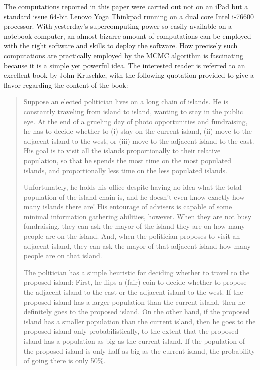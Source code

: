 \documentclass[alpha-refs,fleqn]{wiley-article_p2}
\begin{document}
The computations reported in this paper were carried out not on an iPad but a standard issue 64-bit Lenovo Yoga Thinkpad running on a dual core Intel i-76600 processor. With yesterday's supercomputing power so easily available on a notebook computer, an almost bizarre amount of computations can be employed with the right software and skills to deploy the software. How precisely such computations are practically employed by the MCMC algorithm is fascinating because it is a simple yet powerful idea. The interested reader is referred to an excellent book by John Kruschke, with the following quotation provided to give a flavor regarding the content of the book:

\begin{quote}

Suppose an elected politician lives on a long chain of islands. He is constantly traveling from island to island, wanting to stay in the public eye. At the end of a grueling day of photo opportunities and fundraising, he has to decide whether to (i) stay on the current island, (ii) move to the adjacent island to the west, or (iii) move to the adjacent island to the east. His goal is to visit all the islands proportionally to their relative population, so that he spends the most time on the most populated islands, and proportionally less time
on the less populated islands. 

\vspace{1em}

Unfortunately, he holds his office despite having no idea what the total population of the island chain is, and he doesn't even know exactly how many islands there are! His entourage of advisers is capable of some minimal information gathering abilities, however. When they are not busy fundraising, they can ask the mayor of the island they are on how many people are on the island. And, when the politician proposes to visit an adjacent island, they can ask the mayor of that adjacent island how many people are on that island.

\vspace{1em}

The politician has a simple heuristic for deciding whether to travel to the proposed island: First, he flips a (fair) coin to decide whether to propose the adjacent island to the east or the adjacent island to the west. If the proposed island has a larger population than the current island, then he definitely goes to the proposed island. On the other hand, if the proposed island has a smaller population than the current island, then he goes to the proposed island only probabilistically, to the extent that the proposed island has a population as big as the current island. If the population of the proposed island is only
half as big as the current island, the probability of going there is only 50\%.


\end{quote}
\end{document}
